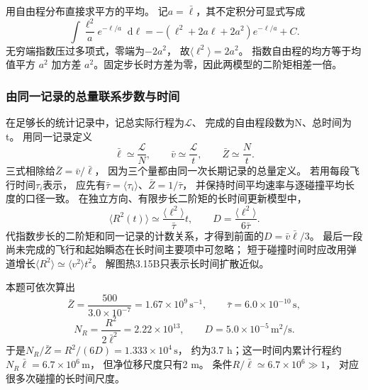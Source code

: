 \documentclass[UTF8,fontset=fandol,a4paper,11pt]{ctexart}
\newcommand{\dd}{\mathop{}\!\mathrm{d}}
\begin{document}
用自由程分布直接求平方的平均。
记$a=\bar\ell$，其不定积分可显式写成
\[
\int\frac{\ell^2}{a}e^{-\ell/a}\dd\ell
=-(\ell^2+2a\ell+2a^2)e^{-\ell/a}+C.
\]
无穷端指数压过多项式，零端为$-2a^2$，
故$\langle\ell^2\rangle=2a^2$。
指数自由程的均方等于均值平方 $a^2$ 加方差 $a^2$。固定步长时方差为零，因此两模型的二阶矩相差一倍。

\subsubsection*{由同一记录的总量联系步数与时间}
在足够长的统计记录中，记总实际行程为$\mathcal L$、
完成的自由程段数为N、总时间为t。
用同一记录定义
\[
\bar\ell\simeq\frac{\mathcal L}{N},\qquad
\bar v\simeq\frac{\mathcal L}{t},\qquad
\bar Z\simeq\frac Nt.
\]
三式相除给$\bar Z=\bar v/\bar\ell$，
因为三个量都由同一次长期记录的总量定义。
若用每段飞行时间$\tau_i$表示，
应先有$\bar\tau=\langle\tau_i\rangle$、$\bar Z=1/\bar\tau$，
并保持时间平均速率与逐碰撞平均长度的口径一致。
在独立方向、有限步长二阶矩的长时间更新模型中，
\[
\langle R^2(t)\rangle\simeq
\frac{\langle\ell^2\rangle}{\bar\tau}t,\qquad
D=\frac{\langle\ell^2\rangle}{6\bar\tau}.
\]
代指数步长的二阶矩和同一记录的计数关系，才得到前面的$D=\bar v\bar\ell/3$。
最后一段尚未完成的飞行和起始瞬态在长时间主要项中可忽略；
短于碰撞时间时应改用弹道增长$\langle R^2\rangle\simeq\langle v^2\rangle t^2$。
解图热3.15B只表示长时间扩散近似。

本题可依次算出
\[
\bar Z=\frac{500}{3.0\times10^{-7}}
=1.67\times10^9\,\mathrm{s^{-1}},\qquad
\bar\tau=6.0\times10^{-10}\,\mathrm s,
\]
\[
N_R=\frac{R^2}{2\bar\ell^2}=2.22\times10^{13},\qquad
D=5.0\times10^{-5}\,\mathrm{m^2/s}.
\]
于是$N_R/\bar Z=R^2/(6D)=1.333\times10^4\,\mathrm s$，
约为3.7 h；这一时间内累计行程约$N_R\bar\ell=6.7\times10^6\,\mathrm m$，
但净位移尺度只有2 m。
条件$R/\bar\ell\simeq6.7\times10^6\gg1$，
对应很多次碰撞的长时间尺度。
\end{document}

